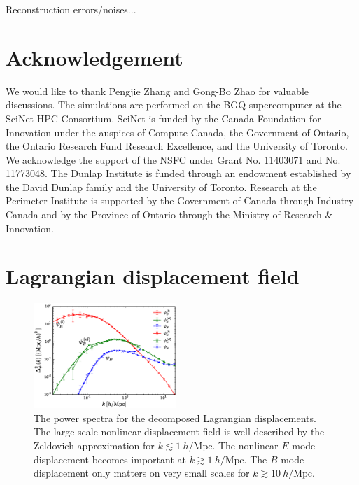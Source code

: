 \documentclass[aps,prx,twocolumn,superscriptaddress,groupedaddress,nofootinbib,amsfont]{revtex4}  %
\newcommand{\mr}{\mathrm}
\begin{document}
Reconstruction errors/noises...



\section{Acknowledgement}
We would like to thank Pengjie Zhang and Gong-Bo Zhao for valuable discussions.
The simulations are performed on the BGQ supercomputer at the SciNet HPC 
Consortium. SciNet is funded by the Canada Foundation for Innovation under 
the auspices of Compute Canada, the Government of Ontario, the Ontario Research 
Fund Research Excellence, and the University of Toronto. We acknowledge the 
support of the NSFC under Grant No. 11403071 and No. 11773048.
The Dunlap Institute is funded through an endowment established by the David Dunlap family and the University of Toronto.
Research at the Perimeter Institute is supported by the Government of Canada
through Industry Canada and by the Province of Ontario through the Ministry of
Research $\&$ Innovation.

\appendix
\section{Lagrangian displacement field}
\label{appendix:A}

\begin{figure}[tbp]
\begin{center}
\includegraphics[width=0.48\textwidth]{f6.eps}
\end{center}
\vspace{-0.7cm}
\caption{The power spectra for the decomposed Lagrangian displacements.
The large scale nonlinear displacement field is well described by the Zeldovich
approximation for $k\lesssim1\ h/\mr{Mpc}$. The nonlinear $E$-mode displacement
becomes important at $k\gtrsim1\ h/\mr{Mpc}$. The $B$-mode displacement only 
matters on very small scales for $k\gtrsim10\ h/\mr{Mpc}$.}
\label{fig:pk_disp}
\end{figure}
\end{document}
